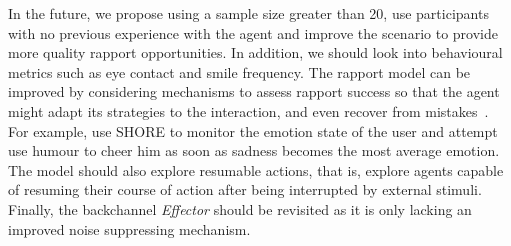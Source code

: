 In the future, we propose using a sample size greater than 20, use participants with no previous experience with the agent and improve the scenario to provide more quality rapport opportunities. In addition, we should look into behavioural metrics such as eye contact and smile frequency. The rapport model can be improved by considering mechanisms to assess rapport success so that the agent might adapt its strategies to the interaction, and even recover from mistakes~\cite{Kahn2008}. For example, use SHORE to monitor the emotion state of the user and attempt use humour to cheer him as soon as sadness becomes the most average emotion. The model should also explore resumable actions, that is, explore agents capable of resuming their course of action after being interrupted by external stimuli. Finally, the backchannel \textit{Effector} should be revisited as it is only lacking an improved noise suppressing mechanism.